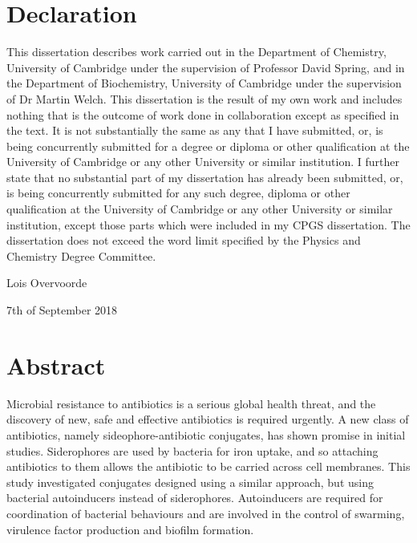 \newpage

\section{Declaration}

This dissertation describes work carried out in the Department of Chemistry, University of Cambridge under the supervision of Professor David Spring, and in the Department of Biochemistry, University of Cambridge under the supervision of Dr Martin Welch. 
This dissertation is the result of my own work and includes nothing that is the outcome of work done in collaboration except as specified in the text. 
It is not substantially the same as any that I have submitted, or, is being concurrently submitted for a degree or diploma or other qualification at the University of Cambridge or any other University or similar institution. 
I further state that no substantial part of my dissertation has already been submitted, or, is being concurrently submitted for any such degree, diploma or other qualification at the University of Cambridge or any other University or similar institution, except those parts which were included in my CPGS dissertation.
The dissertation does not exceed the word limit specified by the Physics and Chemistry Degree Committee.








\vspace{5cm}



Lois Overvoorde

7th of September 2018

\newpage

\section{Abstract}

Microbial resistance to antibiotics is a serious global health threat, and the discovery of new, safe and effective antibiotics is required urgently\cite{ResistanceUS,davies2013drugs,ANIE:ANIE201209979}. A new class of antibiotics, namely sideophore-antibiotic conjugates, has shown promise in initial studies\cite{Page2013,Schalk2017}. Siderophores are used by bacteria for iron uptake, and so attaching antibiotics to them allows the antibiotic to be carried across cell membranes. This study investigated conjugates designed using a similar approach, but using bacterial autoinducers\cite{Waters2005} instead of siderophores. Autoinducers are required for coordination of bacterial behaviours and are involved in the control of swarming, virulence factor production and biofilm formation\cite{Miller2001}. 

